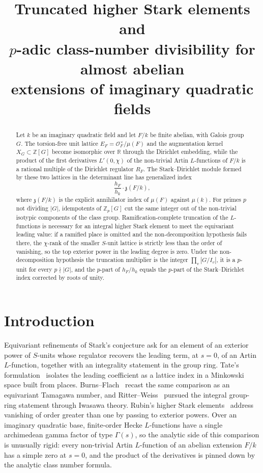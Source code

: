 \documentclass[11pt]{article}
\title{Truncated higher Stark elements and\\
$p$-adic class-number divisibility for almost abelian\\
extensions of imaginary quadratic fields}
\author{}
\date{}
\theoremstyle{plain}
\theoremstyle{definition}
\theoremstyle{remark}
\newcommand{\Z}{\mathbb{Z}}
\newcommand{\R}{\mathbb{R}}
\newcommand{\OK}{\mathcal{O}}
\begin{document}
\maketitle

\begin{abstract}
Let $k$ be an imaginary quadratic field and let $F/k$ be finite abelian, with Galois group $G$.
The torsion-free unit lattice $E_F=\OK_F^\times/\mu(F)$ and the augmentation kernel $X_G\subset\Z[G]$ become isomorphic over $\R$ through the Dirichlet embedding, while the product of the first derivatives $L'(0,\chi)$ of the non-trivial Artin $L$-functions of $F/k$ is a rational multiple of the Dirichlet regulator $R_F$.
The Stark--Dirichlet module formed by these two lattices in the determinant line has generalized index
\[
  \frac{h_F}{h_k}\cdot\mathfrak{z}(F/k),
\]
where $\mathfrak{z}(F/k)$ is the explicit annihilator index of $\mu(F)$ against $\mu(k)$.
For primes $p$ not dividing $|G|$, idempotents of $\Z_p[G]$ cut the same integer out of the non-trivial isotypic components of the class group.
Ramification-complete truncation of the $L$-functions is necessary for an integral higher Stark element to meet the equivariant leading value: if a ramified place is omitted and the non-decomposition hypothesis fails there, the $\chi$-rank of the smaller $S$-unit lattice is strictly less than the order of vanishing, so the top exterior power in the leading degree is zero.
Under the non-decomposition hypothesis the truncation multiplier is the integer $\prod_v|G/I_v|$, it is a $p$-unit for every $p\nmid|G|$, and the $p$-part of $h_F/h_k$ equals the $p$-part of the Stark--Dirichlet index corrected by roots of unity.
\end{abstract}

\section{Introduction}
\label{sec:intro}

Equivariant refinements of Stark's conjecture ask for an element of an exterior power of $S$-units whose regulator recovers the leading term, at $s=0$, of an Artin $L$-function, together with an integrality statement in the group ring.
Tate's formulation~\cite{TateStark} isolates the leading coefficient as a lattice index in a Minkowski space built from places.
Burns--Flach~\cite{BurnsFlach} recast the same comparison as an equivariant Tamagawa number, and Ritter--Weiss~\cite{RitterWeiss} pursued the integral group-ring statement through Iwasawa theory.
Rubin's higher Stark elements~\cite{RubinStark} address vanishing of order greater than one by passing to exterior powers.
Over an imaginary quadratic base, finite-order Hecke $L$-functions have a single archimedean gamma factor of type $\Gamma(s)$, so the analytic side of this comparison is unusually rigid: every non-trivial Artin $L$-function of an abelian extension $F/k$ has a simple zero at $s=0$, and the product of the derivatives is pinned down by the analytic class number formula.
\end{document}
